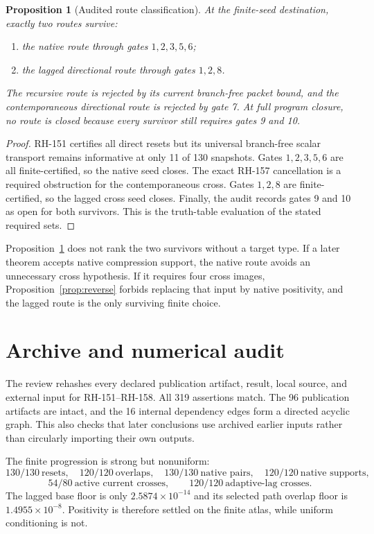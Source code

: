 \documentclass[12pt]{article}
\newtheorem{proposition}[theorem]{Proposition}
\begin{document}
\begin{proposition}[Audited route classification]\label{prop:lattice}
At the finite-seed destination, exactly two routes survive:
\begin{enumerate}
\item the native route through gates $1,2,3,5,6$;
\item the lagged directional route through gates $1,2,8$.
\end{enumerate}
The recursive route is rejected by its current branch-free packet bound, and
the contemporaneous directional route is rejected by gate 7.  At full program
closure, no route is closed because every survivor still requires gates 9 and
10.
\end{proposition}
\begin{proof}
RH-151 certifies all direct resets but its universal branch-free scalar
transport remains informative at only 11 of 130 snapshots.  Gates
$1,2,3,5,6$ are all finite-certified, so the native seed closes.  The exact
RH-157 cancellation is a required obstruction for the contemporaneous cross.
Gates $1,2,8$ are finite-certified, so the lagged cross seed closes.  Finally,
the audit records gates 9 and 10 as open for both survivors.  This is the
truth-table evaluation of the stated required sets.
\end{proof}

Proposition~\ref{prop:lattice} does not rank the two survivors without a
target type.  If a later theorem accepts native compression support, the
native route avoids an unnecessary cross hypothesis.  If it requires four
cross images, Proposition~\ref{prop:reverse} forbids replacing that input by
native positivity, and the lagged route is the only surviving finite choice.

\section{Archive and numerical audit}
The review rehashes every declared publication artifact, result, local
source, and external input for RH-151--RH-158.  All 319 assertions match.
The 96 publication artifacts are intact, and the 16 internal dependency edges
form a directed acyclic graph.  This also checks that later conclusions use
archived earlier inputs rather than circularly importing their own outputs.

The finite progression is strong but nonuniform:
\[
130/130\ \text{resets},\quad120/120\ \text{overlaps},\quad
130/130\ \text{native pairs},\quad120/120\ \text{native supports},
\]
\[
54/80\ \text{active current crosses},\qquad
120/120\ \text{adaptive-lag crosses}.
\]
The lagged base floor is only $2.5874\times10^{-14}$ and its selected path
overlap floor is $1.4955\times10^{-8}$.  Positivity is therefore settled on
the finite atlas, while uniform conditioning is not.
\end{document}

